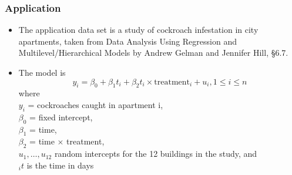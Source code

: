 \documentclass{beamer}
\begin{document}
	\begin{frame}
		\frametitle{Application}
		\begin{itemize}
			\item The application data set is a study of cockroach infestation in city apartments, taken from
			      Data Analysis Using Regression and Multilevel/Hierarchical Models by Andrew Gelman and Jennifer
			      Hill, \S 6.7.
			\item The model is $$y_i = \beta_0 + \beta_1 t_i + \beta_2 t_i \times \text{treatment}_i + u_i, 1 \leq i \leq n$$ 
			where\\
			      $y_i$ = cockroaches caught in apartment i, \\
			      $\beta_0$ = fixed intercept, \\
			      $\beta_1$ = time, \\
			      $\beta_2$ = time $\times$ treatment, \\
			      $u_1, \ldots, u_{12}$ random intercepts for the 12 buildings in the study, and \\
			      $_it$ is the time in days\\
		\end{itemize}
	\end{frame}
	
\end{document}
